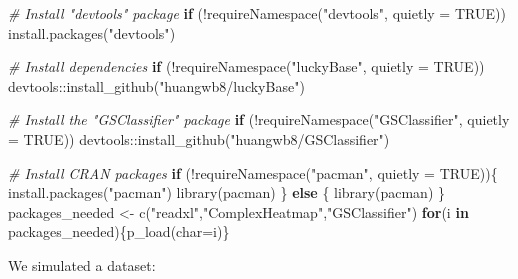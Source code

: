 \documentclass[
]{book}
\newenvironment{Shaded}{\begin{snugshade}}{\end{snugshade}}
\newcommand{\AttributeTok}[1]{\textcolor[rgb]{0.77,0.63,0.00}{#1}}
\newcommand{\CommentTok}[1]{\textcolor[rgb]{0.56,0.35,0.01}{\textit{#1}}}
\newcommand{\ConstantTok}[1]{\textcolor[rgb]{0.00,0.00,0.00}{#1}}
\newcommand{\ControlFlowTok}[1]{\textcolor[rgb]{0.13,0.29,0.53}{\textbf{#1}}}
\newcommand{\FunctionTok}[1]{\textcolor[rgb]{0.00,0.00,0.00}{#1}}
\newcommand{\NormalTok}[1]{#1}
\newcommand{\OtherTok}[1]{\textcolor[rgb]{0.56,0.35,0.01}{#1}}
\newcommand{\SpecialCharTok}[1]{\textcolor[rgb]{0.00,0.00,0.00}{#1}}
\newcommand{\StringTok}[1]{\textcolor[rgb]{0.31,0.60,0.02}{#1}}
\begin{document}
\begin{Shaded}
\begin{Highlighting}[]
\CommentTok{\# Install "devtools" package}
\ControlFlowTok{if}\NormalTok{ (}\SpecialCharTok{!}\FunctionTok{requireNamespace}\NormalTok{(}\StringTok{"devtools"}\NormalTok{, }\AttributeTok{quietly =} \ConstantTok{TRUE}\NormalTok{))}
  \FunctionTok{install.packages}\NormalTok{(}\StringTok{"devtools"}\NormalTok{)}

\CommentTok{\# Install dependencies}
\ControlFlowTok{if}\NormalTok{ (}\SpecialCharTok{!}\FunctionTok{requireNamespace}\NormalTok{(}\StringTok{"luckyBase"}\NormalTok{, }\AttributeTok{quietly =} \ConstantTok{TRUE}\NormalTok{))}
\NormalTok{  devtools}\SpecialCharTok{::}\FunctionTok{install\_github}\NormalTok{(}\StringTok{"huangwb8/luckyBase"}\NormalTok{)}

\CommentTok{\# Install the "GSClassifier" package}
\ControlFlowTok{if}\NormalTok{ (}\SpecialCharTok{!}\FunctionTok{requireNamespace}\NormalTok{(}\StringTok{"GSClassifier"}\NormalTok{, }\AttributeTok{quietly =} \ConstantTok{TRUE}\NormalTok{))}
\NormalTok{  devtools}\SpecialCharTok{::}\FunctionTok{install\_github}\NormalTok{(}\StringTok{"huangwb8/GSClassifier"}\NormalTok{)}

\CommentTok{\# Install CRAN packages}
\ControlFlowTok{if}\NormalTok{ (}\SpecialCharTok{!}\FunctionTok{requireNamespace}\NormalTok{(}\StringTok{"pacman"}\NormalTok{, }\AttributeTok{quietly =} \ConstantTok{TRUE}\NormalTok{))\{}
  \FunctionTok{install.packages}\NormalTok{(}\StringTok{"pacman"}\NormalTok{)}
  \FunctionTok{library}\NormalTok{(pacman)}
\NormalTok{\} }\ControlFlowTok{else}\NormalTok{ \{}
  \FunctionTok{library}\NormalTok{(pacman)}
\NormalTok{\}}
\NormalTok{packages\_needed }\OtherTok{\textless{}{-}} \FunctionTok{c}\NormalTok{(}\StringTok{"readxl"}\NormalTok{,}\StringTok{"ComplexHeatmap"}\NormalTok{,}\StringTok{"GSClassifier"}\NormalTok{)}
\ControlFlowTok{for}\NormalTok{(i }\ControlFlowTok{in}\NormalTok{ packages\_needed)\{}\FunctionTok{p\_load}\NormalTok{(}\AttributeTok{char=}\NormalTok{i)\}}
\end{Highlighting}
\end{Shaded}

We simulated a dataset:
\end{document}
